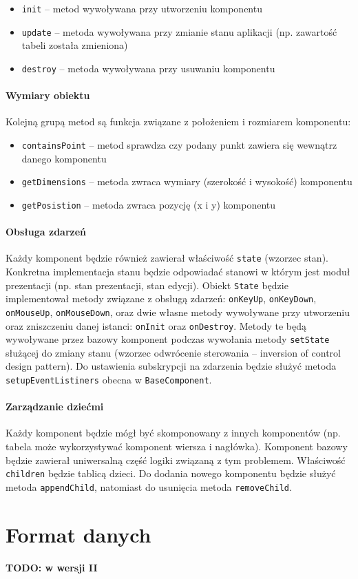\documentclass{article}
\def\code#1{\texttt{#1}}
\begin{document}
\begin{itemize}
    \item \code{init} -- metod wywoływana przy utworzeniu komponentu
    \item \code{update} -- metoda wywoływana przy zmianie stanu aplikacji (np. zawartość tabeli została zmieniona)
    \item \code{destroy} -- metoda wywoływana przy usuwaniu komponentu
\end{itemize}

\paragraph{Wymiary obiektu} Kolejną grupą metod są funkcja związane z położeniem i rozmiarem komponentu:

\begin{itemize}
    \item \code{containsPoint} -- metod sprawdza czy podany punkt zawiera się wewnątrz danego komponentu
    \item \code{getDimensions} -- metoda zwraca wymiary (szerokość i wysokość) komponentu
    \item \code{getPosistion} -- metoda zwraca pozycję (x i y) komponentu
\end{itemize}

\paragraph{Obsługa zdarzeń}
\label{p:eventsHandling}
Każdy komponent będzie również zawierał właściwość \code{state} (wzorzec stan). Konkretna implementacja stanu będzie odpowiadać stanowi w którym jest moduł prezentacji (np. stan prezentacji, stan edycji). Obiekt \code{State} będzie implementował metody związane z obsługą zdarzeń: \code{onKeyUp}, \code{onKeyDown}, \code{onMouseUp}, \code{onMouseDown}, oraz dwie własne metody wywoływane przy utworzeniu oraz zniszczeniu danej istanci: \code{onInit} oraz \code{onDestroy}. Metody te będą wywoływane przez bazowy komponent podczas wywołania metody \code{setState} służącej do zmiany stanu (wzorzec odwrócenie sterowania -- inversion of control design pattern). Do ustawienia subskrypcji na zdarzenia będzie służyć metoda \code{setupEventListiners} obecna w \code{BaseComponent}.

\paragraph{Zarządzanie dziećmi}
Każdy komponent będzie mógł być skomponowany z innych komponentów  (np. tabela może wykorzystywać komponent wiersza i nagłówka). Komponent bazowy będzie zawierał uniwersalną część logiki związaną z tym problemem. Właściwość \code{children} będzie tablicą dzieci. Do dodania nowego komponentu będzie służyć metoda \code{appendChild}, natomiast do usunięcia metoda \code{removeChild}.

\section{Format danych}

\textbf{TODO: w wersji II}
\end{document}
